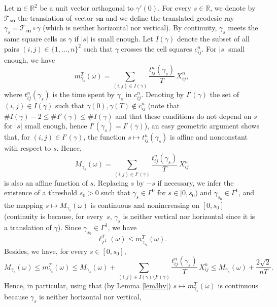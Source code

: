 \documentclass[JEP,XML,SOM,Unicode, NoEqCountersInSection,NoFloatCountersInSection,published]{cedram}
\def\R{\mathbb{R}}
\theoremstyle{definition}
\begin{document}
Let $\boldsymbol{n}\in\R^2$ be a unit vector orthogonal to $\gamma'(0)$.
For every $s\in\R$, we denote by $\mathcal{T}_{s\boldsymbol{n}}$ the translation of vector $s\boldsymbol{n}$ and we define the translated geodesic ray $\gamma_s= \mathcal{T}_{s\boldsymbol{n}} \circ \gamma$ (which is neither horizontal nor vertical). By continuity, $\gamma_s$ meets the same square cells as $\gamma$ if $\vert s\vert$ is small enough. Let $I(\gamma)$ denote the subset of all pairs $(i,j)\in\{1,\ldots,n\}^2$ such that $\gamma$ crosses the cell squares $c_{ij}^n$. For $\vert s\vert$ small enough, we have
\[
m^T_{\gamma_s}(\omega)=\sum_{(i,j)\in I(\gamma)} \frac{t_{ij}^n(\gamma_s)}{T}\, X_{ij}^n,
\]
where $t_{ij}^n(\gamma_s)$ is the time spent by $\gamma_s$ in $c_{ij}^n$.
Denoting by $I'(\gamma)$ the set of $(i,j)\in I(\gamma)$ such that $\gamma(0), \gamma(T) \notin \mathring{c}_{ij}^n$ (note that $\# I(\gamma) - 2 \leq \# I '(\gamma) \leq \# I(\gamma)$ {and that these conditions do not depend on $s$ for $\vert s\vert$ small enough, hence $I '(\gamma_s)=I '(\gamma)$}), an easy geometric argument shows that, for $(i,j)\in I'(\gamma)$, the function $s\mapsto t_{ij}^n(\gamma_s)$ is affine and nonconstant with respect to $s$.
Hence,
\begin{equation}\label{defMom}
M_{\gamma_s}(\omega) = \sum_{(i,j) \in I'(\gamma)} \frac{t_{ij}^n(\gamma_s)}{T}\,X_{ij}^n
\end{equation}
is also an affine function of $s$.
Replacing $s$ by $-s$ if necessary, we infer the existence of a threshold $s_0 >0$ such that {$\gamma_s\in\Gamma^0$ for $s\in[0,s_0)$} and $\gamma_{s_0}\in\Gamma^1$, and the mapping $s\mapsto M_{\gamma_s}(\omega)$ is {continuous and nonincreasing} on $[0,s_0]$ {(continuity is because, for every~$s$, $\gamma_s$ is neither vertical nor horizontal since it is a translation of $\gamma$)}.
Since $\gamma_{s_0}\in\Gamma^1$, we have
\begin{equation}\label{11:19}
\ell_{\Gamma^1}^T(\omega) \leq m^T_{\gamma_{s_0}} (\omega).
\end{equation}
Besides, we have, {for every $s\in[0,s_0]$,}
\begin{equation}\label{MTforalls}
M_{\gamma_s}(\omega)\leq m^T_{\gamma_s}(\omega) \leq M_{\gamma_s}(\omega) + \sum_{(i,j) \in I(\gamma) \setminus I'(\gamma) } \frac{t_{ij}^n(\gamma_s)}{T}\, X_{ij}^n \leq M_{\gamma_s}(\omega) + \frac{2 \sqrt{2}}{nT}.
\end{equation}
Hence, in particular, {using that (by Lemma \ref{lem3hv}) $s\mapsto m^T_{\gamma_s} (\omega)$ is continuous because $\gamma_s$ is neither horizontal nor vertical,}
\end{document}
